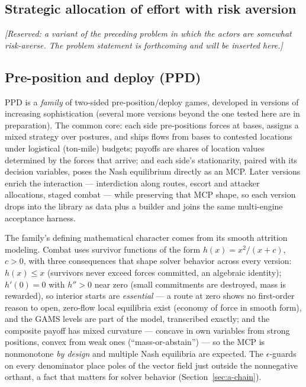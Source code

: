 \subsection{Strategic allocation of effort with risk aversion}
\label{sec:a-saoe-risk}

\emph{[Reserved: a variant of the preceding problem in which the actors are
somewhat risk-averse. The problem statement is forthcoming and will be
inserted here.]}

\subsection{Pre-position and deploy (PPD)}
\label{sec:a-ppd}

PPD is a \emph{family} of two-sided pre-position/deploy games, developed in
versions of increasing sophistication (several more versions beyond the one
tested here are in preparation). The common core: each side pre-positions
forces at bases, assigns a mixed strategy over postures, and ships flows
from bases to contested locations under logistical (ton-mile) budgets;
payoffs are shares of location values determined by the forces that arrive;
and each side's stationarity, paired with its decision variables, poses the
Nash equilibrium directly as an MCP. Later versions enrich the interaction
--- interdiction along routes, escort and attacker allocations, staged
combat --- while preserving that MCP shape, so each version drops into the
library as data plus a  builder and joins the same
multi-engine acceptance harness.

The family's defining mathematical character comes from its smooth
attrition modeling. Combat uses survivor functions of the form
$h(x) = x^2/(x + c)$, $c > 0$, with three consequences that shape solver
behavior across every version: $h(x) \le x$ (survivors never exceed forces
committed, an algebraic identity); $h'(0) = 0$ with $h'' > 0$ near zero
(small commitments are destroyed, mass is rewarded), so interior starts
are \emph{essential} --- a route at zero shows no first-order reason to
open, zero-flow local equilibria exist (economy of force in smooth form),
and the GAMS  levels are part of the model, transcribed exactly;
and the composite payoff has mixed curvature --- concave in own variables
from strong positions, convex from weak ones (``mass-or-abstain'') --- so
the MCP is nonmonotone \emph{by design} and multiple Nash equilibria are
expected. The $\epsilon$-guards on every denominator place poles of the
vector field just outside the nonnegative orthant, a fact that matters for
solver behavior (Section~\ref{sec:a-chain}).

